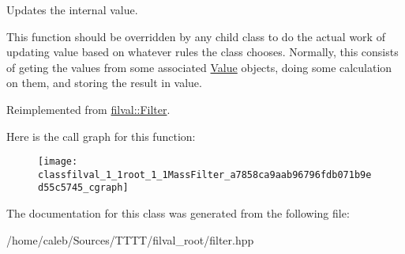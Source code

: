 Updates the internal value. 

This function should be overridden by any child class to do the actual work of updating value based on whatever rules the class chooses. Normally, this consists of geting the values from some associated \hyperlink{classfilval_1_1Value}{Value} objects, doing some calculation on them, and storing the result in value. 

Reimplemented from \hyperlink{classfilval_1_1Filter_ac91ccc66b66c8ea8cdad27fd9b4b62e2}{filval\+::\+Filter}.

Here is the call graph for this function\+:
\nopagebreak
\begin{figure}[H]
\begin{center}
\leavevmode
\texttt{[image: classfilval\_1\_1root\_1\_1MassFilter\_a7858ca9aab96796fdb071b9ed55c5745\_cgraph]}
\end{center}
\end{figure}


The documentation for this class was generated from the following file\+:\begin{DoxyCompactItemize}
\item 
/home/caleb/\+Sources/\+T\+T\+T\+T/filval\+\_\+root/filter.\+hpp\end{DoxyCompactItemize}

